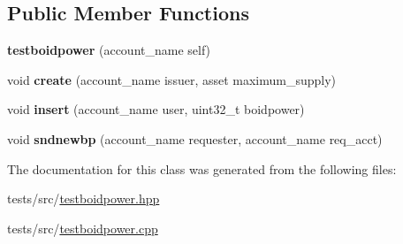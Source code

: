 \subsection*{Public Member Functions}
\begin{DoxyCompactItemize}
\item 
{\bfseries testboidpower} (account\+\_\+name self)\hypertarget{classtestboidpower_aa2d01a3deb4873f954c1455b9d698488}{}\label{classtestboidpower_aa2d01a3deb4873f954c1455b9d698488}

\item 
void {\bfseries create} (account\+\_\+name issuer, asset maximum\+\_\+supply)\hypertarget{classtestboidpower_a8a3bf0266a0c39055cc7c48568a19519}{}\label{classtestboidpower_a8a3bf0266a0c39055cc7c48568a19519}

\item 
void {\bfseries insert} (account\+\_\+name user, uint32\+\_\+t boidpower)\hypertarget{classtestboidpower_a6aa85bf9e05658c236c1a63edb07da14}{}\label{classtestboidpower_a6aa85bf9e05658c236c1a63edb07da14}

\item 
void {\bfseries sndnewbp} (account\+\_\+name requester, account\+\_\+name req\+\_\+acct)\hypertarget{classtestboidpower_a742acb44487e0a240cf412d1b93227a3}{}\label{classtestboidpower_a742acb44487e0a240cf412d1b93227a3}

\end{DoxyCompactItemize}


The documentation for this class was generated from the following files\+:\begin{DoxyCompactItemize}
\item 
tests/src/\hyperlink{testboidpower_8hpp}{testboidpower.\+hpp}\item 
tests/src/\hyperlink{testboidpower_8cpp}{testboidpower.\+cpp}\end{DoxyCompactItemize}
